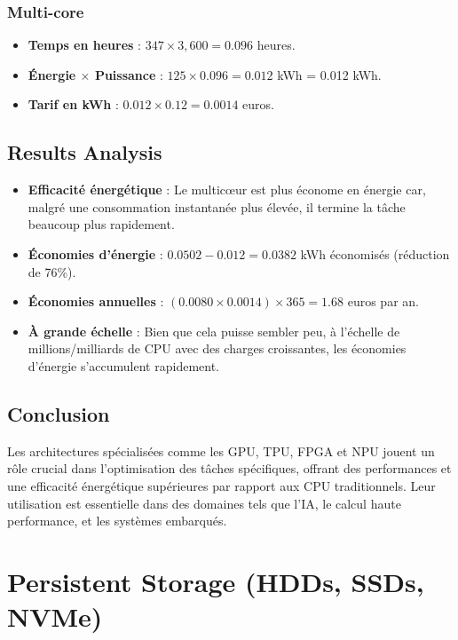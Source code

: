 \documentclass[10pt,a4paper]{article}
\begin{document}
\subsubsection*{Multi-core}
\begin{itemize}
    \item \textbf{Temps en heures} : \(347 \times 3,600 = 0.096\) heures.
    \item \textbf{Énergie \(\times\) Puissance} : \(125 \times 0.096 = 0.012\) kWh = 0.012 kWh.
    \item \textbf{Tarif en kWh} : \(0.012 \times 0.12 = 0.0014\) euros.
\end{itemize}

\subsection*{Results Analysis}
\begin{itemize}
    \item \textbf{Efficacité énergétique} : Le multicœur est plus économe en énergie car, malgré une consommation instantanée plus élevée, il termine la tâche beaucoup plus rapidement.
    \item \textbf{Économies d'énergie} : \(0.0502 - 0.012 = 0.0382\) kWh économisés (réduction de 76\%).
    \item \textbf{Économies annuelles} : \((0.0080 \times 0.0014) \times 365 = 1.68\) euros par an.
    \item \textbf{À grande échelle} : Bien que cela puisse sembler peu, à l'échelle de millions/milliards de CPU avec des charges croissantes, les économies d'énergie s'accumulent rapidement.
\end{itemize}

\subsection*{Conclusion}
Les architectures spécialisées comme les GPU, TPU, FPGA et NPU jouent un rôle crucial dans l'optimisation des tâches spécifiques, offrant des performances et une efficacité énergétique supérieures par rapport aux CPU traditionnels. Leur utilisation est essentielle dans des domaines tels que l'IA, le calcul haute performance, et les systèmes embarqués.

\section*{Persistent Storage (HDDs, SSDs, NVMe)}
\end{document}
